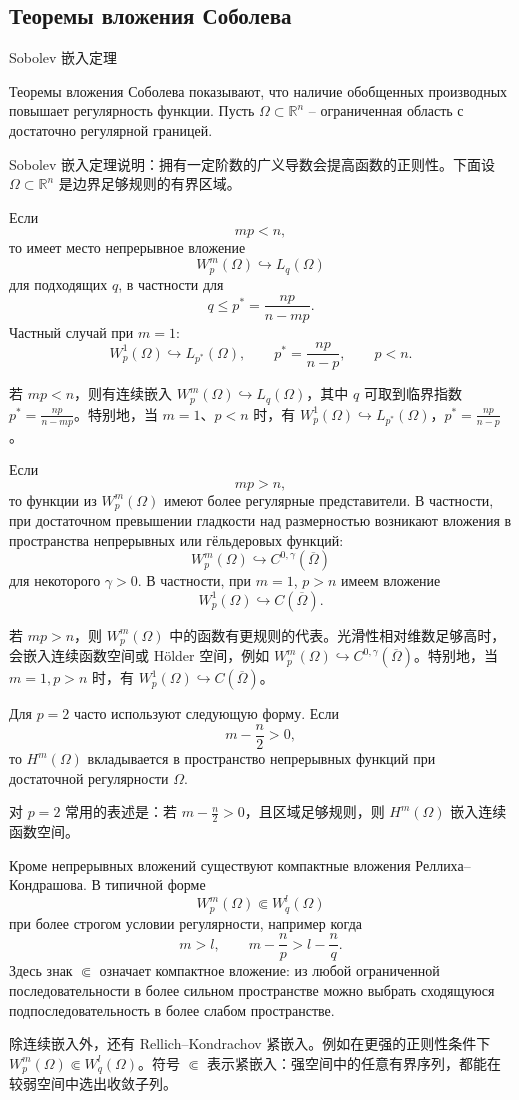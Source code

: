 \documentclass[12pt,a4paper]{article}
\newcommand{\R}{\mathbb{R}}
\newcommand{\zh}[1]{\par\noindent #1\par}
\begin{document}
\subsection*{Теоремы вложения Соболева}
\zh{Sobolev 嵌入定理}
Теоремы вложения Соболева показывают, что наличие обобщенных производных повышает регулярность функции. Пусть \(\Omega\subset\R^n\) -- ограниченная область с достаточно регулярной границей.
\zh{Sobolev 嵌入定理说明：拥有一定阶数的广义导数会提高函数的正则性。下面设 \(\Omega\subset\R^n\) 是边界足够规则的有界区域。}


Если
\[
mp<n,
\]
то имеет место непрерывное вложение
\[
W_p^m(\Omega)\hookrightarrow L_q(\Omega)
\]
для подходящих \(q\), в частности для
\[
q\le p^*=\frac{np}{n-mp}.
\]
Частный случай при \(m=1\):
\[
W_p^1(\Omega)\hookrightarrow L_{p^*}(\Omega),
\qquad
p^*=\frac{np}{n-p},
\qquad p<n.
\]
\zh{若 \(mp<n\)，则有连续嵌入 \(W_p^m(\Omega)\hookrightarrow L_q(\Omega)\)，其中 \(q\) 可取到临界指数 \(p^*=\frac{np}{n-mp}\)。特别地，当 \(m=1\)、\(p<n\) 时，有 \(W_p^1(\Omega)\hookrightarrow L_{p^*}(\Omega)\)，\(p^*=\frac{np}{n-p}\)。}

Если
\[
mp>n,
\]
то функции из \(W_p^m(\Omega)\) имеют более регулярные представители. В частности, при достаточном превышении гладкости над размерностью возникают вложения в пространства непрерывных или гёльдеровых функций:
\[
W_p^m(\Omega)\hookrightarrow C^{0,\gamma}(\overline\Omega)
\]
для некоторого \(\gamma>0\). В частности, при \(m=1\), \(p>n\) имеем вложение
\[
W_p^1(\Omega)\hookrightarrow C(\overline\Omega).
\]
\zh{若 \(mp>n\)，则 \(W_p^m(\Omega)\) 中的函数有更规则的代表。光滑性相对维数足够高时，会嵌入连续函数空间或 Hölder 空间，例如 \(W_p^m(\Omega)\hookrightarrow C^{0,\gamma}(\overline\Omega)\)。特别地，当 \(m=1,p>n\) 时，有 \(W_p^1(\Omega)\hookrightarrow C(\overline\Omega)\)。}

Для \(p=2\) часто используют следующую форму. Если
\[
m-\frac n2>0,
\]
то \(H^m(\Omega)\) вкладывается в пространство непрерывных функций при достаточной регулярности \(\Omega\).
\zh{对 \(p=2\) 常用的表述是：若 \(m-\frac n2>0\)，且区域足够规则，则 \(H^m(\Omega)\) 嵌入连续函数空间。}

Кроме непрерывных вложений существуют компактные вложения Реллиха--Кондрашова. В типичной форме
\[
W_p^m(\Omega)\Subset W_q^l(\Omega)
\]
при более строгом условии регулярности, например когда
\[
m>l,
\qquad
m-\frac np>l-\frac nq.
\]
Здесь знак \(\Subset\) означает компактное вложение: из любой ограниченной последовательности в более сильном пространстве можно выбрать сходящуюся подпоследовательность в более слабом пространстве.
\zh{除连续嵌入外，还有 Rellich--Kondrachov 紧嵌入。例如在更强的正则性条件下 \(W_p^m(\Omega)\Subset W_q^l(\Omega)\)。符号 \(\Subset\) 表示紧嵌入：强空间中的任意有界序列，都能在较弱空间中选出收敛子列。}
\end{document}
